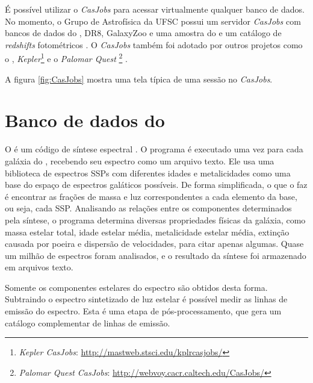 É possível utilizar o {\em CasJobs} para acessar virtualmente qualquer banco de
dados. No momento, o Grupo de Astrofísica da UFSC possui um servidor {\em
CasJobs} com bancos de dados do \starlight, \SDSS DR8, GalaxyZoo
\citep{Lintott2008} e uma amostra do \galex e um catálogo de {\em redshifts}
fotométricos \citep{OMill2011}. O {\em CasJobs} também foi adotado por outros
projetos como o \galex, {\em Kepler}\footnote{{\em Kepler CasJobs}:
\url{http://mastweb.stsci.edu/kplrcasjobs/}} e o {\em Palomar Quest
}\footnote{{\em Palomar Quest CasJobs}:
\url{http://webvoy.cacr.caltech.edu/CasJobs/}} \citep{Djorgovski2008}.

A figura \ref{fig:CasJobs} mostra uma tela típica de uma sessão no {\em
CasJobs}.



\section{Banco de dados do \STARLIGHT}

O \starlight é um código de síntese espectral \citep{CidFernandes2005}. O
programa é executado uma vez para cada galáxia do \SDSS, recebendo seu espectro
como um arquivo texto. Ele usa uma biblioteca de espectros SSPs com diferentes
idades e metalicidades como uma base do espaço de espectros galáticos possíveis.
De forma simplificada, o que o \starlight faz é encontrar as frações de massa e
luz correspondentes a cada elemento da base, ou seja, cada SSP. Analisando as
relações entre os componentes determinados pela síntese, o programa determina
diversas propriedades físicas da galáxia, como massa estelar total, idade
estelar média, metalicidade estelar média, extinção causada por poeira e
dispersão de velocidades, para citar apenas algumas. Quase um milhão de
espectros foram analisados, e o resultado da síntese foi armazenado em arquivos
texto.

Somente os componentes estelares do espectro são obtidos desta forma. Subtraindo
o espectro sintetizado de luz estelar é possível medir as linhas de emissão do
espectro. Esta é uma etapa de pós-processamento, que gera um catálogo
complementar de linhas de emissão.

